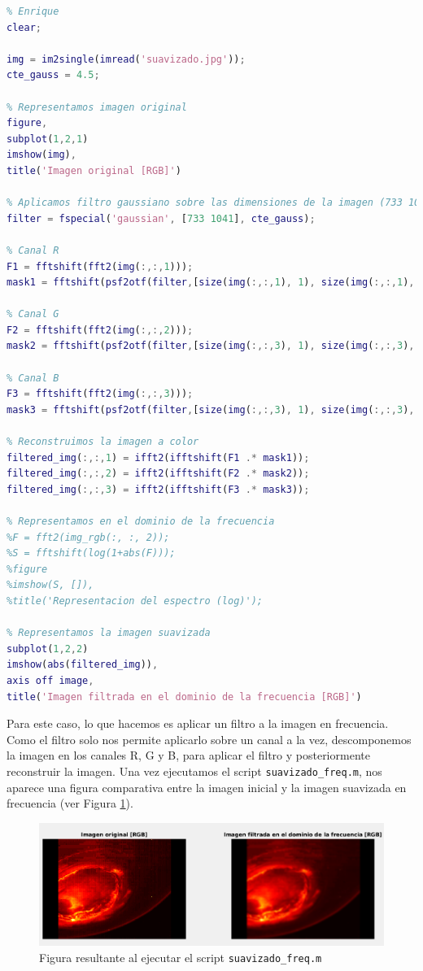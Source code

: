 \documentclass[12pt]{article}
\begin{document}
	\begin{lstlisting}[language=Matlab, caption={Implementación suavizado en el dominio de la frecuencia en \texttt{MATLAB}}]
% 4 - Suavizado
% Enrique
clear;

img = im2single(imread('suavizado.jpg'));
cte_gauss = 4.5;

% Representamos imagen original
figure,
subplot(1,2,1)
imshow(img),
title('Imagen original [RGB]')

% Aplicamos filtro gaussiano sobre las dimensiones de la imagen (733 1041)
filter = fspecial('gaussian', [733 1041], cte_gauss);

% Canal R
F1 = fftshift(fft2(img(:,:,1)));
mask1 = fftshift(psf2otf(filter,[size(img(:,:,1), 1), size(img(:,:,1), 2)]));

% Canal G
F2 = fftshift(fft2(img(:,:,2)));
mask2 = fftshift(psf2otf(filter,[size(img(:,:,3), 1), size(img(:,:,3), 2)]));

% Canal B
F3 = fftshift(fft2(img(:,:,3)));
mask3 = fftshift(psf2otf(filter,[size(img(:,:,3), 1), size(img(:,:,3), 2)]));

% Reconstruimos la imagen a color
filtered_img(:,:,1) = ifft2(ifftshift(F1 .* mask1));
filtered_img(:,:,2) = ifft2(ifftshift(F2 .* mask2));
filtered_img(:,:,3) = ifft2(ifftshift(F3 .* mask3));

% Representamos en el dominio de la frecuencia
%F = fft2(img_rgb(:, :, 2));
%S = fftshift(log(1+abs(F)));
%figure
%imshow(S, []),
%title('Representacion del espectro (log)');

% Representamos la imagen suavizada
subplot(1,2,2)
imshow(abs(filtered_img)),
axis off image,
title('Imagen filtrada en el dominio de la frecuencia [RGB]')
	\end{lstlisting}
	
	\pagebreak
	
	\noindent Para este caso, lo que hacemos es aplicar un filtro a la imagen en frecuencia. Como el filtro solo nos permite aplicarlo sobre un canal a la vez, descomponemos la imagen en los canales R, G y B, para aplicar el filtro y posteriormente reconstruir la imagen. Una vez ejecutamos el script \texttt{suavizado\_freq.m}, nos aparece una figura comparativa entre la imagen inicial y la imagen suavizada en frecuencia (ver Figura \ref{img: suavizado freq}).
	
	\begin{figure}[h]
		\begin{center}
			\includegraphics[width=1\textwidth]{img/suavizado_freq.png}
			\caption{Figura resultante al ejecutar el script \texttt{suavizado\_freq.m}}
			\label{img: suavizado freq}
		\end{center}
	\end{figure}
\end{document}
